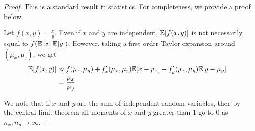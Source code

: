 \begin{proof}
  This is a standard result in statistics. For completeness, we provide a proof below. 

  Let $f(x,y) = \frac{x}{y}$.
  Even if $x$ and $y$ are independent, $\mathbb{E}[f(x,y)]$ is not necessarily equal to $f(\mathbb{E}[x],\mathbb{E}[y])$.
  However, taking a first-order Taylor expansion around $(\mu_x, \mu_y)$, we get
  \begin{align*}
    \mathbb{E}[f(x,y)] 
     &\approx f(\mu_x,\mu_y) + f_x'(\mu_x, \mu_y) \mathbb{E}[x - \mu_x] + f'_y(\mu_x, \mu_y) \mathbb{E}[y - \mu_y] \\
     &= \frac{\mu_x}{\mu_y}.
  \end{align*}


  We note that if $x$ and $y$ are the sum of independent random variables, then by the central limit theorem all moments of $x$ and $y$ greater than $1$ go to $0$ as $n_x, n_y \to \infty$.

\end{proof}

